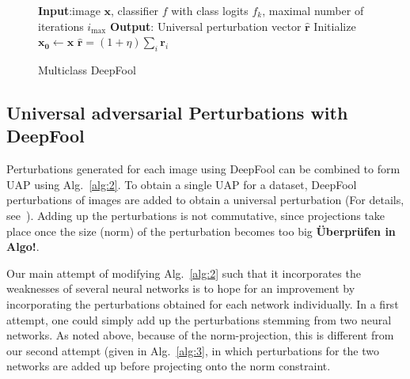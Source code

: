 \documentclass[runningheads]{llncs}
\begin{document}
\begin{figure}
\begin{algorithm}[H]\label{alg:1}
\SetAlgoLined
{\bf Input}:image \(\mathbf{x}\), classifier \(f\) with class logits \(f_k\), maximal number of iterations \(i_{\text{max}}\)\;
{\bf Output}: Universal perturbation vector \(\mathbf{\hat{r}}\)\;
Initialize \(\mathbf{x_0} \gets \mathbf{x}\)\;
\Return \(\mathbf{\hat{r}}=(1+\eta)\sum_i \mathbf{r}_i\)
 \caption{Multiclass DeepFool}
\end{algorithm}
\end{figure}

\subsection{Universal adversarial Perturbations with DeepFool}
Perturbations generated for each image using DeepFool can be combined to form UAP using Alg.~\ref{alg:2}. To obtain a single UAP for a dataset, DeepFool perturbations of images are added to obtain a universal perturbation (For details, see~\cite{moosavi-dezfooli_universal_2017}). Adding up the perturbations is not commutative, since projections take place once the size (norm) of the perturbation becomes too big {\bf Überprüfen in Algo!}. 

Our main attempt of modifying Alg.~\ref{alg:2} such that it incorporates the weaknesses of several neural networks is to hope for an improvement by incorporating the perturbations obtained for each network individually. In a first attempt, one could simply add up the perturbations stemming from two neural networks. As noted above, because of the norm-projection, this is different from our second attempt (given in Alg.~\ref{alg:3}, in which perturbations for the two networks are added up before projecting onto the norm constraint.
\end{document}
